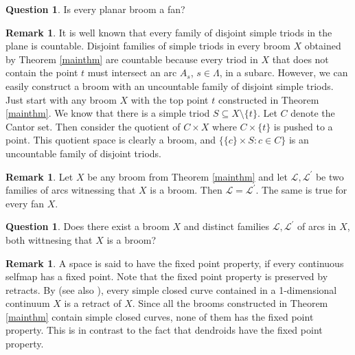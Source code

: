 \documentclass[12pt]{article}
\theoremstyle{definition}
\newtheorem{question}[theorem]{Question}
\newtheorem{remark}[theorem]{Remark}
\theoremstyle{remark}
\begin{document}
\begin{question}
Is every planar broom a fan?
\end{question}

\begin{remark}
It is well known that every family of disjoint simple triods in the plane is countable.
Disjoint families of simple triods in every broom $X$ obtained by Theorem \ref{mainthm} are countable because every triod in $X$ that does not contain the point $t$ must intersect an arc $A_s$, $s\in\Lambda$, in a subarc.
However, we can easily construct a broom with an uncountable family of disjoint simple triods. Just start with any broom $X$ with the top point $t$ constructed in Theorem \ref{mainthm}. We know that there is a simple triod $S\subseteq X\setminus \{t\}$. Let $C$ denote the Cantor set. Then consider the quotient of $C\times X$ where $C\times\{t\}$ is pushed to a point. This quotient space is clearly a broom, and $\{\{c\}\times S: c\in C\}$ is an uncountable family of disjoint triods.
\end{remark}

\begin{remark}\label{differentArcs}
Let $X$ be any broom from Theorem \ref{mainthm} and 
let $\mathcal L, \mathcal L^\prime$ be two families of arcs witnessing that $X$ is a broom. Then $\mathcal L =\mathcal L^\prime$. The same is true for every fan $X$.
\end{remark}


\begin{question}
Does there exist a broom $X$ and distinct families $\mathcal L, \mathcal L^\prime$ of arcs in $X$, both wittnesing that $X$ is a broom?
\end{question}

\begin{remark}
A space is said to have the fixed point property, if every continuous selfmap has a fixed point. Note that the fixed point property is preserved by retracts.
By \cite[Theorem 1, p.354]{Kuratowski} (see also \cite[Proposition 2.4]{IllanesKrupski}),
every simple closed curve contained in a 1-dimensional continuum $X$ is a retract of $X$.
Since all the brooms constructed in Theorem \ref{mainthm} contain simple closed curves, none of them has the fixed point property. This is in contrast to the fact that dendroids have the fixed point property.
\end{remark}
\end{document}
